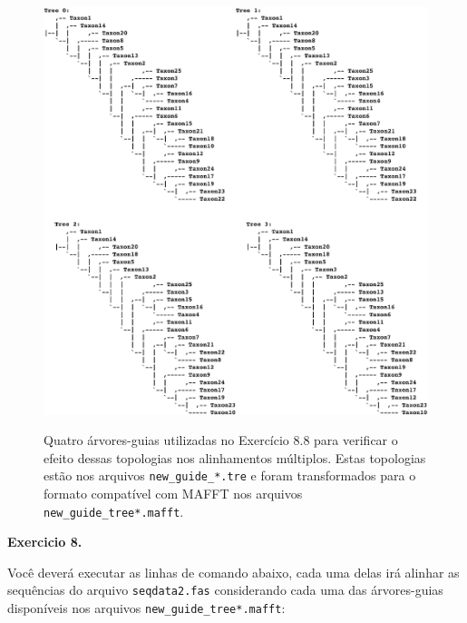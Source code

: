 \begin{refsection}
  \begin{figure}[h!]
       \centering
      {\includegraphics[scale=0.6]{figures/tut8/guide_trees.eps}}
	{\caption[árvores-guias]{Quatro árvores-guias utilizadas no Exercício 8.8 para verificar o efeito dessas topologias nos alinhamentos múltiplos. Estas topologias estão nos arquivos \texttt{new\_guide\_*.tre} e foram transformados para o formato compatível com MAFFT nos arquivos \texttt{new\_guide\_tree*.mafft}.}\label{tut8:fig:guide_trees}}
  \end{figure}




\begin{blackBlock}{\textbf{Exercicio 8.}}\label{tut8:ex:8.8}

Você deverá executar as linhas de comando abaixo, cada uma delas irá alinhar as sequências do arquivo \texttt{seqdata2.fas} considerando cada uma das árvores-guias disponíveis nos arquivos \texttt{new\_guide\_tree*.mafft}:\\


\end{blackBlock}
\end{refsection}

